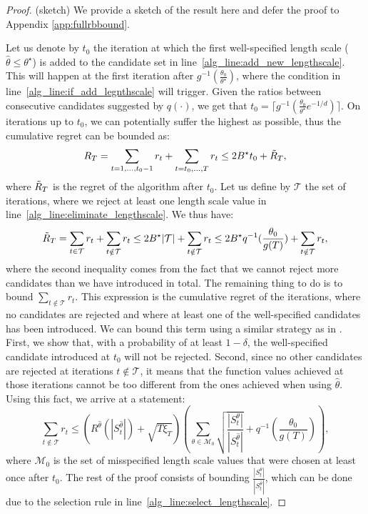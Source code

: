\documentclass{article}
\theoremstyle{plain}
\theoremstyle{definition}
\theoremstyle{remark}
\theoremstyle{plain}
\begin{document}
\begin{proof}(sketch) We provide a sketch of the result here and defer the proof to Appendix \ref{app:fullrbbound}. 

Let us denote by $t_0$ the iteration at which the first well-specified length scale ($\hat{\theta} \le \theta^\star$) is added to the candidate set in line~\ref{alg_line:add_new_lengthscale}. This will happen at the first iteration after $g^{-1}(\frac{\theta_0}{\theta^\star})$, where the condition in line~\ref{alg_line:if_add_legnthscale} will trigger. Given the ratios between consecutive candidates suggested by $q(\cdot)$, we get that $t_0 = \lceil g^{-1}(\frac{\theta_0}{\theta^\star} e^{-1/d}) \rceil$. On iterations up to $t_0$, we can potentially suffer the highest as possible, thus the cumulative regret can be bounded as:
\begin{equation*}
    R_T = \sum_{t=1,\dots,t_0-1}r_t + \sum_{t=t_0,\dots,T} r_t \le 2B^\star t_0 + \Tilde{R}_T ,
\end{equation*}
where $\Tilde{R}_T$ is the regret of the algorithm after $t_0$. Let us define by $\mathcal{T}$ the set of iterations, where we reject at least one length scale value in line~\ref{alg_line:eliminate_lengthscale}. We thus have:
\begin{equation*}
    \Tilde{R}_T = \sum_{t \in \mathcal{T}} r_t + \sum_{t \notin \mathcal{T}} r_t \le 2B^\star|\mathcal{T}| +  \sum_{t \notin \mathcal{T}} r_t \le 2B^\star q^{-1}(\frac{\theta_0}{g(T)})  +  \sum_{t \notin \mathcal{T}} r_t ,
\end{equation*}
where the second inequality comes from the fact that we cannot reject more candidates than we have introduced in total. The remaining thing to do is to bound $\sum_{t \notin \mathcal{T}} r_t$. This expression is the cumulative regret of the iterations, where no candidates are rejected and where at least one of the well-specified candidates has been introduced. We can bound this term using a similar strategy as in \cite{pacchiano2020regret}. First, we show that, with a probability of at least $1 - \delta$, the well-specified candidate introduced at $t_0$ will not be rejected. Second, since no other candidates are rejected at iterations $t \notin \mathcal{T}$, it means that the function values achieved at those iterations cannot be too different from the ones achieved when using $\hat{\theta}$. Using this fact, we arrive at a statement:
\begin{equation*}
    \sum_{t \notin \mathcal{T}} r_t \le \left(R^{\hat{\theta}}(|S_t^{\hat{\theta}}|) + \sqrt{T\xi_T}  \right) \left(\sum_{\theta \in \mathcal{M}_0}\sqrt{\frac{|S_t^{\theta}|}{|S_t^{\hat{\theta}}|}} + q^{-1} \left(\frac{\theta_0}{g(T)} \right) \right),
\end{equation*}
where $\mathcal{M}_0$ is the set of misspecified length scale values that were chosen at least once after $t_0$. The rest of the proof consists of bounding $\frac{|S_t^{\theta}|}{|S_t^{\hat{\theta}}|}$, which can be done due to the selection rule in line~\ref{alg_line:select_lengthscale}. 

\end{proof}
\end{document}
